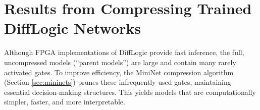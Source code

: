 







\section{Results from Compressing Trained DiffLogic Networks}
\label{sec:results_compression}

Although FPGA implementations of DiffLogic provide fast inference, the full, uncompressed models (``parent models'') are large and contain many rarely activated gates. To improve efficiency, the MiniNet compression algorithm (Section \ref{sec:mininets}) prunes these infrequently used gates, maintaining essential decision-making structures. This yields models that are computationally simpler, faster, and more interpretable.

